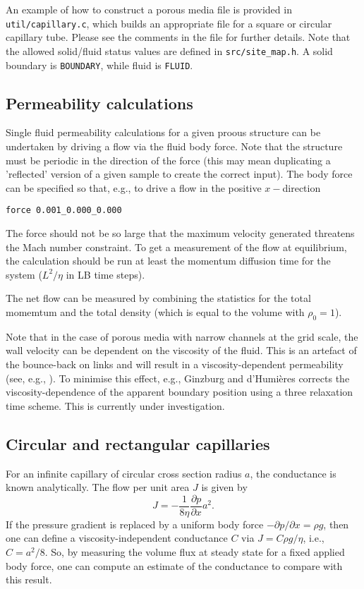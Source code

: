 An example of how to construct a porous media file is provided in
\texttt{util/capillary.c}, which builds an appropriate file for
a square or circular capillary tube. Please see the comments in
the file for further details. Note that the allowed
solid/fluid status values are defined in \texttt{src/site\_map.h}.
A solid boundary is \texttt{BOUNDARY}, while fluid is \texttt{FLUID}.

\subsection{Permeability calculations}

Single fluid permeability calculations for a given proous structure
can be undertaken by driving a flow via the fluid body force. Note
that the structure must be periodic in the direction of the force
(this may mean duplicating a 'reflected' version of a given sample
to create the correct input). The body force can be specified so
that, e.g., to drive a flow in the positive $x-$direction

\texttt{force 0.001\_0.000\_0.000}

The force should not be so large that the maximum velocity generated
threatens the Mach number constraint. To get a measurement of the
flow at equilibrium, the calculation should be run at least the
momentum diffusion time for the system ($L^2/\eta$ in LB time steps).

The net flow can be measured by combining the statistics for the
total momemtum and the total density (which is equal to the volume
with $\rho_0 = 1$).

Note that in the case of porous media with narrow channels at the grid
scale, the wall velocity can be dependent on the viscosity of the fluid.
This is an artefact of the bounce-back on links and will result in a
viscosity-dependent permeability (see, e.g., \cite{lipanmiller}).
To minimise this effect, e.g.,  Ginzburg and d'Humi\`eres \cite{ginzburg}
corrects the viscosity-dependence of the apparent boundary position
using a three relaxation time scheme. This is currently under
investigation.


\subsection{Circular and rectangular capillaries}

\label{section:exact_conductance}

For an infinite  capillary of circular cross section radius $a$,
the conductance is known analytically\cite{papanastasiou}. The
flow per unit area $J$ is given by
\begin{equation}
J = - \frac{1}{8\eta} \frac{\partial p}{ \partial x} a^2. 
\end{equation}
If the pressure gradient is replaced by a uniform body force
$-\partial p/ \partial x = \rho g$, then one can define a
viscosity-independent conductance $C$ via $ J = C \rho g / \eta$,
i.e., $C = a^2/8$. So, by measuring the volume flux at steady state
for a fixed applied body force, one can compute an estimate of the
conductance to compare with this result.


